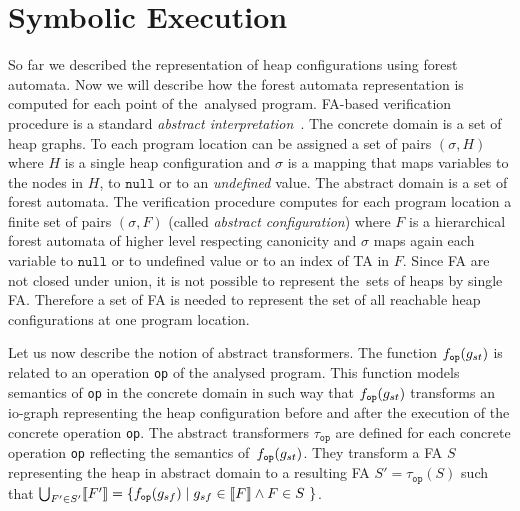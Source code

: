 
\section{Symbolic Execution}
\label{sec:se}

So far we described the representation of heap configurations using forest automata.
Now we will describe how the forest automata representation is computed for each point of the~analysed program.
FA-based verification procedure is a standard \emph{abstract interpretation}~\cite{cousot:77}.
The concrete domain is a set of heap graphs.
To each program location can be assigned a set of pairs
$(\sigma,H)$ where
$H$ is a single heap configuration and
$\sigma$ is a mapping that maps variables
to the nodes in $H$, to $\texttt{null}$ or to an \emph{undefined} value.
The abstract domain is a set of forest automata.
The verification procedure computes for each program location
a finite set of pairs $(\sigma, F)$ (called \emph{abstract configuration}) where
$F$ is a hierarchical forest automata of higher level respecting canonicity and
$\sigma$ maps again each variable to
$\texttt{null}$ or to undefined value or to an index of TA in $F$.
Since FA are not closed under union, it is not possible to represent the~sets of heaps by single FA.
Therefore a set of FA is needed to represent the set of all reachable heap
configurations at one program location.

Let us now describe the notion of abstract transformers.
The function $f_{\texttt{op}}(g_{st})$ is related to an operation \texttt{op} of the analysed program.
This function models semantics of \texttt{op} in the concrete domain in such way that $f_{\texttt{op}}(g_{st})$
transforms an io-graph representing the heap configuration before and after the execution of
the concrete operation \texttt{op}.
The abstract transformers $\tau_{\texttt{op}}$ are defined for each concrete
operation \texttt{op} reflecting the semantics of~$f_{\texttt{op}}(g_{st})$.
They transform a FA $S$ representing the heap in abstract domain to a resulting FA $S' = \tau_{\texttt{op}}(S)$
such that $\bigcup_{F' \in S'} \llbracket F' \rrbracket = \{f_{\texttt{op}}(g_{sf}) \mid g_{sf} \in \llbracket F \rrbracket \wedge F \in S~\}$.


